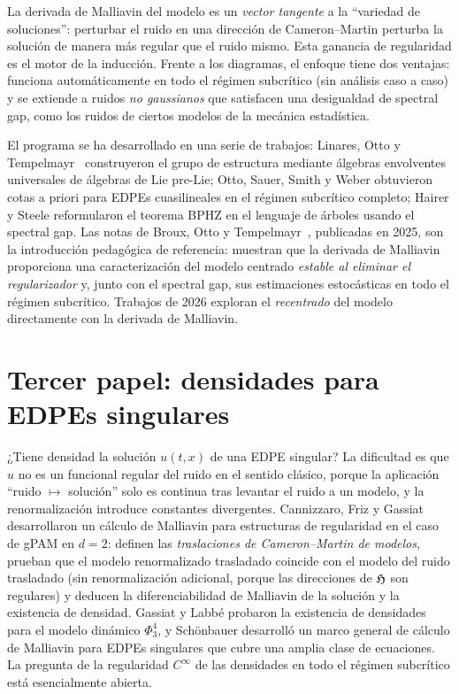 \begin{intuicion}
La derivada de Malliavin del modelo es un \emph{vector tangente} a la ``variedad de soluciones'':
perturbar el ruido en una dirección de Cameron--Martin perturba la solución de manera
más regular que el ruido mismo. Esta ganancia de regularidad es el motor de la inducción.
Frente a los diagramas, el enfoque tiene dos ventajas: funciona automáticamente en todo
el régimen subcrítico (sin análisis caso a caso) y se extiende a ruidos \emph{no gaussianos} que
satisfacen una desigualdad de spectral gap, como los ruidos de ciertos modelos de la
mecánica estadística.
\end{intuicion}

El programa se ha desarrollado en una serie de trabajos: Linares, Otto y Tempelmayr~\cite{LinaresOttoTempelmayr23}
construyeron el grupo de estructura mediante álgebras envolventes universales de álgebras de
Lie pre-Lie; Otto, Sauer, Smith y Weber obtuvieron cotas a priori para EDPEs cuasilineales en
el régimen subcrítico completo; Hairer y Steele reformularon el teorema BPHZ en el lenguaje
de árboles usando el spectral gap. Las notas de Broux, Otto y Tempelmayr~\cite{BrouxOttoTempelmayr25}, publicadas
en 2025, son la introducción pedagógica de referencia: muestran que la derivada de Malliavin
proporciona una caracterización del modelo centrado \emph{estable al eliminar el regularizador} y, junto
con el spectral gap, sus estimaciones estocásticas en todo el régimen subcrítico. Trabajos de
2026 exploran el \emph{recentrado} del modelo directamente con la derivada de Malliavin.

\section{Tercer papel: densidades para EDPEs singulares}
¿Tiene densidad la solución $u(t,x)$ de una EDPE singular? La dificultad es que $u$ no es un
funcional regular del ruido en el sentido clásico, porque la aplicación ``ruido $\mapsto$ solución'' solo es
continua tras levantar el ruido a un modelo, y la renormalización introduce constantes divergentes.
Cannizzaro, Friz y Gassiat~\cite{CannizzaroFrizGassiat17} desarrollaron un cálculo de Malliavin para estructuras de
regularidad en el caso de gPAM en $d=2$: definen las \emph{traslaciones de Cameron--Martin de
modelos}, prueban que el modelo renormalizado trasladado coincide con el modelo del ruido
trasladado (sin renormalización adicional, porque las direcciones de $\mathfrak{H}$ son regulares) y deducen
la diferenciabilidad de Malliavin de la solución y la existencia de densidad. Gassiat y Labbé
probaron la existencia de densidades para el modelo dinámico $\Phi^4_3$, y Schönbauer desarrolló un
marco general de cálculo de Malliavin para EDPEs singulares que cubre una amplia clase de
ecuaciones. La pregunta de la regularidad $C^\infty$ de las densidades en todo el régimen subcrítico
está esencialmente abierta.
